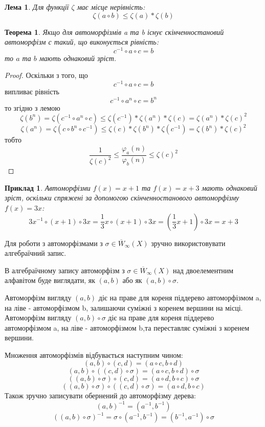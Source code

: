 \documentclass[a4paper,12pt]{article} \usepackage{a4wide}
\numberwithin{equation}{subsection}
\newtheorem{theorem}{Теорема}[subsection]
\newtheorem{lemma}{Лема}[subsection]
\newtheorem{example}{Приклад}[subsection]
\begin{document}
 \begin{lemma}
   Для функції $\zeta$ має місце нерівність: $$\zeta(a\circ b)\leqslant \zeta(a)*\zeta(b)$$
   \end{lemma}

    \begin{theorem}
    Якщо для автоморфізмів a та b існує скінченностановий автоморфізм с такий, що виконується рівність: $$c^{-1}\circ a\circ c=b$$
    то $a$ та $b$ мають однаковий зріст.
     \end{theorem}
 \begin{proof}
    Оскільки з того, що $$c^{-1}\circ a\circ c=b$$ випливає рівність $$c^{-1}\circ a^n \circ c=b^n$$
    то згідно з лемою $$\zeta(b^n)=\zeta(c^{-1}\circ a^n \circ c) \leqslant \zeta (c^{-1})*\zeta(a^n)*\zeta(c)=\zeta (a^n)*\zeta (c)^2$$
    $$\zeta (a^n)=\zeta(c \circ b^n \circ c^{-1})\leqslant \zeta(c)*\zeta(b^n)* \zeta (c^{-1})=\zeta (b^n)*\zeta (c)^2$$
    тобто
    \[
\frac{1}{\zeta(c)^2} \le \frac{{\varphi _a (n)}}{{\varphi _b (n)}} \le \zeta(c)^2
\]
 \end{proof}
 \begin{example}
 Автоморфізми $f(x)=x+1$ та $f(x)=x+3$ мають однаковий зріст, оскільки спряжені за допомогою скінченностанового автоморфізму $f(x)=3x$:
$$3x^{-1}\circ (x+1)\circ 3x = \frac{1}{3}x\circ (x+1)\circ 3x=(\frac{1}{3}x+1)\circ 3x=x+3$$
 \end{example}

 Для роботи з автоморфізмами з $\sigma \in \overline{W}_\infty (X) $ зручно використовувати алгебраїчний запис.


 В алгебраїчному запису автоморфізм з $\sigma \in \overline{W}_\infty (X) $ над двоелементним алфавітом
  буде виглядати, як $(a,b)$ або як $(a,b)\circ \sigma$.


  Автоморфізм вигляду $(a,b)$
  діє на праве для кореня піддерево автоморфізмом a, на ліве - автоморфізмом b, залишаючи суміжні
   з коренем вершини на місці.
Автоморфізм вигляду $(a,b)\circ \sigma$  діє на праве для кореня піддерево автоморфізмом a, на ліве - автоморфізмом b,та переставляє суміжні з коренем вершини.


Множення автоморфізмів відбувається наступним чином:
$$(a,b)\circ (c,d)=(a\circ c,b\circ d)$$
$$(a,b)\circ ((c,d)\circ \sigma)=(a\circ c,b\circ d)\circ \sigma$$
$$((a,b)\circ \sigma)\circ (c,d)=(a\circ d,b\circ c)\circ \sigma$$
$$((a,b)\circ \sigma)\circ ((c,d)\circ \sigma)=(a\circ d,b\circ c)$$
Також зручно записувати обернений до автоморфізму дерева:
$$(a,b)^{-1}=(a^{-1},b^{-1})$$
$$((a,b)\circ \sigma)^{-1}=\sigma \circ (a^{-1},b^{-1})=(b^{-1},a^{-1})\circ \sigma$$
\end{document}
